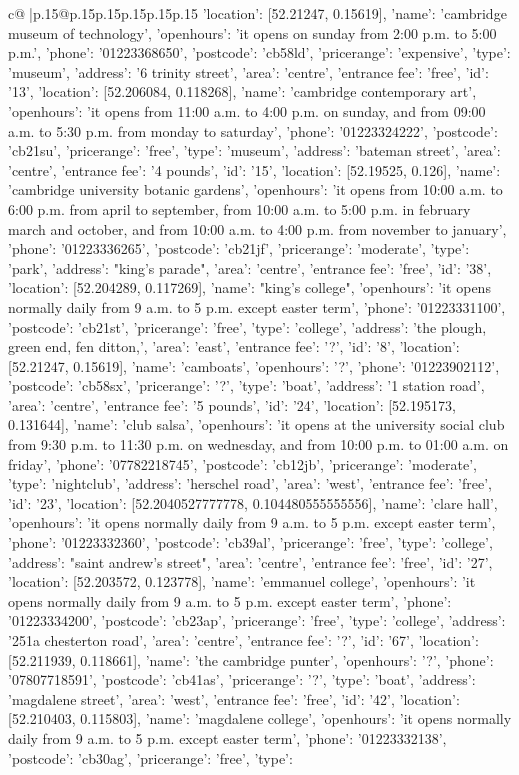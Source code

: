 \documentclass{article}
\begin{document}
{\begin{supertabular}{c@{$\;$}|p{.15\linewidth}@{}p{.15\linewidth}p{.15\linewidth}p{.15\linewidth}p{.15\linewidth}p{.15\linewidth}}
{{{'location': [52.21247, 0.15619], 'name': 'cambridge museum of technology', 'openhours': 'it opens on sunday from 2:00 p.m. to 5:00 p.m.', 'phone': '01223368650', 'postcode': 'cb58ld', 'pricerange': 'expensive', 'type': 'museum'}, {'address': '6 trinity street', 'area': 'centre', 'entrance fee': 'free', 'id': '13', 'location': [52.206084, 0.118268], 'name': 'cambridge contemporary art', 'openhours': 'it opens from 11:00 a.m. to 4:00 p.m. on sunday, and from 09:00 a.m. to 5:30 p.m. from monday to saturday', 'phone': '01223324222', 'postcode': 'cb21su', 'pricerange': 'free', 'type': 'museum'}, {'address': 'bateman street', 'area': 'centre', 'entrance fee': '4 pounds', 'id': '15', 'location': [52.19525, 0.126], 'name': 'cambridge university botanic gardens', 'openhours': 'it opens from 10:00 a.m. to 6:00 p.m. from april to september, from 10:00 a.m. to 5:00 p.m. in february march and october, and from 10:00 a.m. to 4:00 p.m. from november to january', 'phone': '01223336265', 'postcode': 'cb21jf', 'pricerange': 'moderate', 'type': 'park'}, {'address': "king's parade", 'area': 'centre', 'entrance fee': 'free', 'id': '38', 'location': [52.204289, 0.117269], 'name': "king's college", 'openhours': 'it opens normally daily from 9 a.m. to 5 p.m. except easter term', 'phone': '01223331100', 'postcode': 'cb21st', 'pricerange': 'free', 'type': 'college'}, {'address': 'the plough, green end, fen ditton,', 'area': 'east', 'entrance fee': '?', 'id': '8', 'location': [52.21247, 0.15619], 'name': 'camboats', 'openhours': '?', 'phone': '01223902112', 'postcode': 'cb58sx', 'pricerange': '?', 'type': 'boat'}, {'address': '1 station road', 'area': 'centre', 'entrance fee': '5 pounds', 'id': '24', 'location': [52.195173, 0.131644], 'name': 'club salsa', 'openhours': 'it opens at the university social club from 9:30 p.m. to 11:30 p.m. on wednesday, and from 10:00 p.m. to 01:00 a.m. on friday', 'phone': '07782218745', 'postcode': 'cb12jb', 'pricerange': 'moderate', 'type': 'nightclub'}, {'address': 'herschel road', 'area': 'west', 'entrance fee': 'free', 'id': '23', 'location': [52.2040527777778, 0.104480555555556], 'name': 'clare hall', 'openhours': 'it opens normally daily from 9 a.m. to 5 p.m. except easter term', 'phone': '01223332360', 'postcode': 'cb39al', 'pricerange': 'free', 'type': 'college'}, {'address': "saint andrew's street", 'area': 'centre', 'entrance fee': 'free', 'id': '27', 'location': [52.203572, 0.123778], 'name': 'emmanuel college', 'openhours': 'it opens normally daily from 9 a.m. to 5 p.m. except easter term', 'phone': '01223334200', 'postcode': 'cb23ap', 'pricerange': 'free', 'type': 'college'}, {'address': '251a chesterton road', 'area': 'centre', 'entrance fee': '?', 'id': '67', 'location': [52.211939, 0.118661], 'name': 'the cambridge punter', 'openhours': '?', 'phone': '07807718591', 'postcode': 'cb41as', 'pricerange': '?', 'type': 'boat'}, {'address': 'magdalene street', 'area': 'west', 'entrance fee': 'free', 'id': '42', 'location': [52.210403, 0.115803], 'name': 'magdalene college', 'openhours': 'it opens normally daily from 9 a.m. to 5 p.m. except easter term', 'phone': '01223332138', 'postcode': 'cb30ag', 'pricerange': 'free', 'type': }}}
\end{supertabular}}
\end{document}
